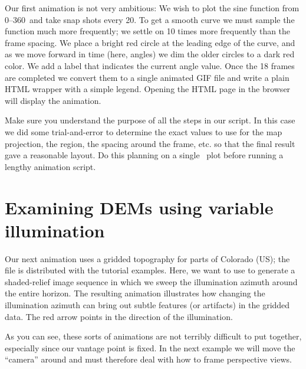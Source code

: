 Our first animation is not very ambitious: We wish to plot the sine
function from 0--360\DS\ and take snap shots every 20\DS.  To get a
smooth curve we must sample the function much more frequently; we
settle on 10 times more frequently than the frame spacing.  We place
a bright red circle at the leading edge of the curve, and as we move
forward in time (here, angles) we dim the older circles to a dark red
color.  We add a label that indicates the current angle value.  Once
the 18 frames are completed we convert them to a single animated GIF file
and write a plain HTML wrapper with a simple legend.  Opening the HTML
page  in the browser will display the animation.


Make sure you understand the purpose of all the steps in our script.
In this case we did some trial-and-error to determine the exact values
to use for the map projection, the region, the spacing around the frame,
etc. so that the final result gave a reasonable layout.  Do this planning
on a single \PS\ plot before running a lengthy animation script.



\section{Examining DEMs using variable illumination}

Our next animation uses a gridded topography for parts of Colorado (US);
the file is distributed with the tutorial examples.  Here, we want to
use  to generate a shaded-relief image sequence in
which we sweep the illumination azimuth around the entire horizon.  The
resulting animation illustrates how changing the illumination azimuth
can bring out subtle features (or artifacts) in the gridded data.  The
red arrow points in the direction of the illumination.


As you can see, these sorts of animations are not terribly difficult to
put together, especially since our vantage point is fixed.  In the next
example we will move the ``camera'' around and must therefore deal with
how to frame perspective views.


